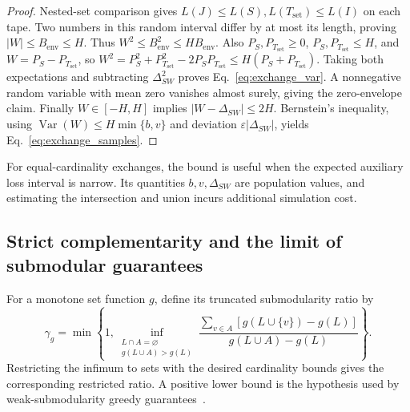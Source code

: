 \documentclass[final,5p,times,twocolumn,sort&compress]{elsarticle}
\theoremstyle{plain}
\newcommand{\Var}{\operatorname{Var}}
\begin{document}
\begin{proof}
Nested-set comparison gives $L(J)\le L(S),L(T_{\mathrm{set}})\le L(I)$ on each tape. Two numbers in this random interval differ by at most its length, proving $|W|\le B_{\mathrm{env}}\le H$. Thus $W^2\le B_{\mathrm{env}}^2\le H B_{\mathrm{env}}$. Also $P_S,P_{T_{\mathrm{set}}}\ge0$, $P_S,P_{T_{\mathrm{set}}}\le H$, and $W=P_S-P_{T_{\mathrm{set}}}$, so
$W^2=P_S^2+P_{T_{\mathrm{set}}}^2-2P_SP_{T_{\mathrm{set}}}\le H(P_S+P_{T_{\mathrm{set}}})$. Taking both expectations and subtracting $\Delta_{SW}^2$ proves Eq.~\ref{eq:exchange_var}. A nonnegative random variable with mean zero vanishes almost surely, giving the zero-envelope claim. Finally $W\in[-H,H]$ implies $|W-\Delta_{SW}|\le2H$. Bernstein's inequality, using $\Var(W)\le H\min\{b,v\}$ and deviation $\varepsilon|\Delta_{SW}|$, yields Eq.~\ref{eq:exchange_samples}.
\end{proof}
For equal-cardinality exchanges, the bound is useful when the expected auxiliary loss interval is narrow. Its quantities $b,v,\Delta_{SW}$ are population values, and estimating the intersection and union incurs additional simulation cost.

\subsection{Strict complementarity and the limit of submodular guarantees}
For a monotone set function $g$, define its truncated submodularity ratio by
\begin{equation}
 \gamma_g=\min\!\left\{1,\inf_{\substack{L\cap A=\varnothing\\g(L\cup A)>g(L)}}
 \frac{\sum_{v\in A}[g(L\cup\{v\})-g(L)]}{g(L\cup A)-g(L)}\right\}.
 \label{eq:ratio}
\end{equation}
Restricting the infimum to sets with the desired cardinality bounds gives the corresponding restricted ratio. A positive lower bound is the hypothesis used by weak-submodularity greedy guarantees~\cite{das2018}.
\end{document}
